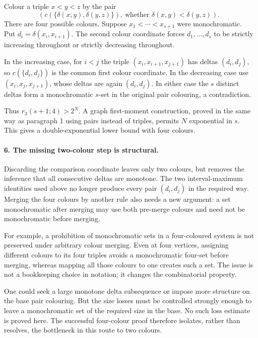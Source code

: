 \documentclass[11pt]{article}
\begin{document}
Colour a triple $x<y<z$ by the pair
\[
 \left(c(\{\delta(x,y),\delta(y,z)\}),
 \ \text{whether }\delta(x,y)<\delta(y,z)\right).
\]
There are four possible colours. Suppose $x_1<\cdots<x_{s+1}$ were monochromatic. Put $d_i=\delta(x_i,x_{i+1})$. The second colour coordinate forces $d_1,\ldots,d_s$ to be strictly increasing throughout or strictly decreasing throughout.

In the increasing case, for $i<j$ the triple $(x_i,x_{i+1},x_{j+1})$ has deltas $(d_i,d_j)$, so $c(\{d_i,d_j\})$ is the common first colour coordinate. In the decreasing case use $(x_i,x_j,x_{j+1})$, whose deltas are again $(d_i,d_j)$. In either case the $s$ distinct deltas form a monochromatic $s$-set in the original pair colouring, a contradiction.

Thus $r_3(s+1;4)>2^N$. A graph first-moment construction, proved in the same way as paragraph 1 using pairs instead of triples, permits $N$ exponential in $s$. This gives a double-exponential lower bound with four colours.

\paragraph{6. The missing two-colour step is structural.}
Discarding the comparison coordinate leaves only two colours, but removes the inference that all consecutive deltas are monotone. The two interval-maximum identities used above no longer produce every pair $(d_i,d_j)$ in the required way. Merging the four colours by another rule also needs a new argument: a set monochromatic after merging may use both pre-merge colours and need not be monochromatic before merging.

For example, a prohibition of monochromatic sets in a four-coloured system is not preserved under arbitrary colour merging. Even at four vertices, assigning different colours to its four triples avoids a monochromatic four-set before merging, whereas mapping all those colours to one creates such a set. The issue is not a bookkeeping choice in notation; it changes the combinatorial property.

One could seek a large monotone delta subsequence or impose more structure on the base pair colouring. But the size losses must be controlled strongly enough to leave a monochromatic set of the required size in the base. No such loss estimate is proved here. The successful four-colour proof therefore isolates, rather than resolves, the bottleneck in this route to two colours.
\end{document}
